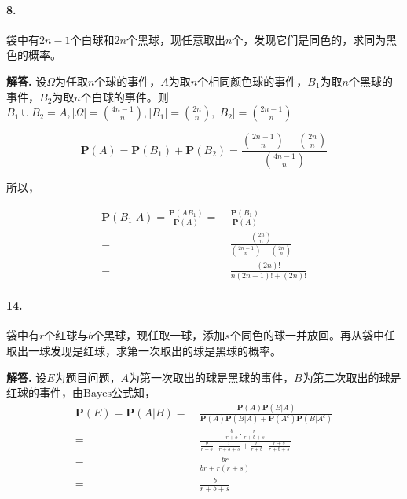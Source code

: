 \documentclass[12pt, a4paper, oneside]{ctexart}
\newenvironment{solution}{\par\noindent\textbf{解答. }}{\bigskip\par}
\begin{document}
\paragraph{8.}袋中有$2n-1$个白球和$2n$个黑球，现任意取出$n$个，发现它们是同色的，求同为黑色的概率。
\begin{solution}
    设$\Omega$为任取$n$个球的事件，$A$为取$n$个相同颜色球的事件，$B_1$为取$n$个黑球的事件，$B_2$为取$n$个白球的事件。则$B_1\cup B_2 = A, |\Omega| = \binom{4n-1}{n}, |B_1| = \binom{2n}{n}, |B_2| = \binom{2n-1}{n}$

    \begin{equation*}
        \textbf{P}(A) = \textbf{P}(B_1)+\textbf{P}(B_2) = \frac{\binom{2n-1}{n}+\binom{2n}{n}}{\binom{4n-1}{n}}
    \end{equation*}

    所以，

    \begin{equation*}
        \begin{aligned}
            \textbf{P}(B_1|A) = \frac{\textbf{P}(AB_1)}{\textbf{P}(A)} = &\ \frac{\textbf{P}(B_1)}{\textbf{P}(A)}\\
            =&\ \frac{\binom{2n}{n}}{\binom{2n-1}{n}+\binom{2n}{n}}\\
            =&\ \frac{(2n)!}{n(2n-1)!+(2n)!}
        \end{aligned}
    \end{equation*}
\end{solution}
\paragraph{14.}袋中有$r$个红球与$b$个黑球，现任取一球，添加$s$个同色的球一并放回。再从袋中任取出一球发现是红球，求第一次取出的球是黑球的概率。
\begin{solution}
    设$E$为题目问题，$A$为第一次取出的球是黑球的事件，$B$为第二次取出的球是红球的事件，由$\text{Bayes公式}$知，
    \begin{equation*}
        \begin{aligned}
            \textbf{P}(E) = \textbf{P}(A|B) =&\ \frac{\textbf{P}(A)\textbf{P}(B|A)}{\textbf{P}(A)\textbf{P}(B|A)+\textbf{P}(A^c)\textbf{P}(B|A^c)}\\
            =&\ \frac{\frac{b}{r+b}\cdot \frac{r}{r+b+s}}{\frac{b}{r+b}\cdot\frac{r}{r+b+s}+\frac{r}{r+b}\cdot\frac{r+s}{r+b+s}}\\
            =&\ \frac{br}{br+r(r+s)}\\
            =&\ \frac{b}{r+b+s}
        \end{aligned}
    \end{equation*}
\end{solution}
\end{document}

